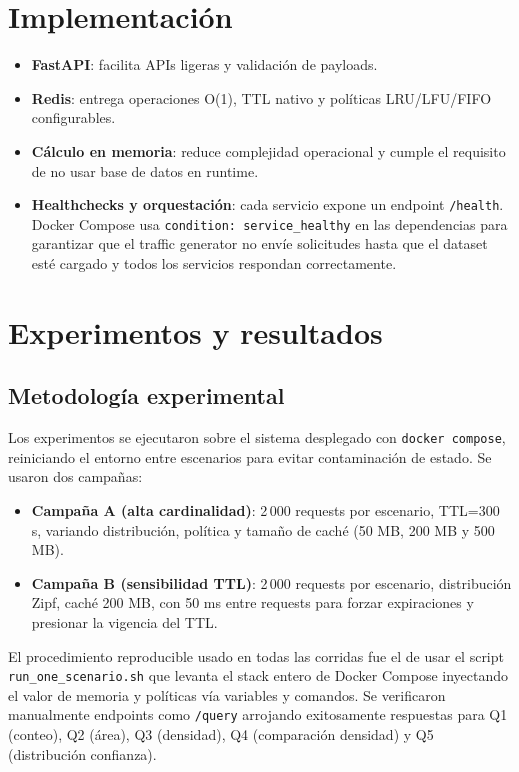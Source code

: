 \documentclass[letter,12pt]{article}
\begin{document}
\section{Implementación}
\begin{itemize}
  \item \textbf{FastAPI}: facilita APIs ligeras y validación de payloads.
  \item \textbf{Redis}: entrega operaciones O(1), TTL nativo y políticas LRU/LFU/FIFO configurables.
  \item \textbf{Cálculo en memoria}: reduce complejidad operacional y cumple el requisito de no usar base de datos en runtime.
  \item \textbf{Healthchecks y orquestación}: cada servicio expone un endpoint \texttt{/health}. Docker Compose usa \texttt{condition: service\_healthy} en las dependencias para garantizar que el traffic generator no envíe solicitudes hasta que el dataset esté cargado y todos los servicios respondan correctamente.
\end{itemize}

\section{Experimentos y resultados}
\subsection{Metodología experimental}
Los experimentos se ejecutaron sobre el sistema desplegado con \texttt{docker compose}, reiniciando el entorno entre escenarios para evitar contaminación de estado. Se usaron dos campañas:
\begin{itemize}
  \item \textbf{Campaña A (alta cardinalidad)}: 2\,000 requests por escenario, TTL=300 s, variando distribución, política y tamaño de caché (50 MB, 200 MB y 500 MB).
  \item \textbf{Campaña B (sensibilidad TTL)}: 2\,000 requests por escenario, distribución Zipf, caché 200 MB, con 50 ms entre requests para forzar expiraciones y presionar la vigencia del TTL.
\end{itemize}

El procedimiento reproducible usado en todas las corridas fue el de usar el script \texttt{run\_one\_scenario.sh} que levanta el stack entero de Docker Compose inyectando el valor de memoria y políticas vía variables y comandos. Se verificaron manualmente endpoints como \texttt{/query} arrojando exitosamente respuestas para Q1 (conteo), Q2 (área), Q3 (densidad), Q4 (comparación densidad) y Q5 (distribución confianza).
\end{document}

